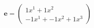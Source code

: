 \documentclass[preview]{standalone}
\begin{document}
\begin{align*}
\mathbf{e} = \begin{pmatrix}1x^{1} + 1x^{2} \\ -1x^{1} + -1x^{2} + 1x^{3}\end{pmatrix}
\end{align*}
\end{document}
